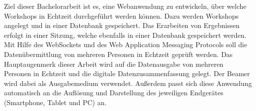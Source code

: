 \label{sec:kurzfassung}
Ziel dieser Bachelorarbeit ist es, eine Webanwendung zu entwickeln, über welche Workshops in Echtzeit durchgeführt werden können. Dazu werden Workshops angelegt und in einer Datenbank gespeichert. Das Erarbeiten von Ergebnissen erfolgt in einer Sitzung, welche ebenfalls in einer Datenbank gespeichert werden. Mit Hilfe des WebSockets und des Web Application Messaging Protocols soll die Datenübermittlung von mehreren Personen in Echtzeit geprüft werden. Das Hauptaugenmerk dieser Arbeit wird auf die Datenausgabe von mehreren Personen in Echtzeit und die digitale Datenzusammenfassung gelegt. Der Beamer wird dabei als Ausgabemedium verwendet. Außerdem passt sich diese Anwendung automatisch an die Auflösung und Darstellung des jeweiligen Endgerätes (Smartphone, Tablet und PC) an. 

